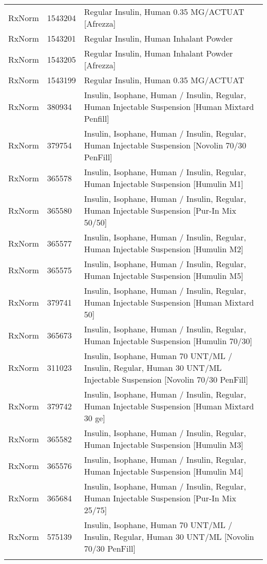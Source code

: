 \begin{longtable}{p{}p{}p{}}
  RxNorm & 1543204 & Regular Insulin, Human 0.35 MG/ACTUAT [Afrezza] \\ 
  RxNorm & 1543201 & Regular Insulin, Human Inhalant Powder \\ 
  RxNorm & 1543205 & Regular Insulin, Human Inhalant Powder [Afrezza] \\ 
  RxNorm & 1543199 & Regular Insulin, Human 0.35 MG/ACTUAT \\ 
  RxNorm & 380934 & Insulin, Isophane, Human / Insulin, Regular, Human Injectable Suspension [Human Mixtard Penfill] \\ 
  RxNorm & 379754 & Insulin, Isophane, Human / Insulin, Regular, Human Injectable Suspension [Novolin 70/30 PenFill] \\ 
  RxNorm & 365578 & Insulin, Isophane, Human / Insulin, Regular, Human Injectable Suspension [Humulin M1] \\ 
  RxNorm & 365580 & Insulin, Isophane, Human / Insulin, Regular, Human Injectable Suspension [Pur-In Mix 50/50] \\ 
  RxNorm & 365577 & Insulin, Isophane, Human / Insulin, Regular, Human Injectable Suspension [Humulin M2] \\ 
  RxNorm & 365575 & Insulin, Isophane, Human / Insulin, Regular, Human Injectable Suspension [Humulin M5] \\ 
  RxNorm & 379741 & Insulin, Isophane, Human / Insulin, Regular, Human Injectable Suspension [Human Mixtard 50] \\ 
  RxNorm & 365673 & Insulin, Isophane, Human / Insulin, Regular, Human Injectable Suspension [Humulin 70/30] \\ 
  RxNorm & 311023 & Insulin, Isophane, Human 70 UNT/ML / Insulin, Regular, Human 30 UNT/ML Injectable Suspension [Novolin 70/30 PenFill] \\ 
  RxNorm & 379742 & Insulin, Isophane, Human / Insulin, Regular, Human Injectable Suspension [Human Mixtard 30 ge] \\ 
  RxNorm & 365582 & Insulin, Isophane, Human / Insulin, Regular, Human Injectable Suspension [Humulin M3] \\ 
  RxNorm & 365576 & Insulin, Isophane, Human / Insulin, Regular, Human Injectable Suspension [Humulin M4] \\ 
  RxNorm & 365684 & Insulin, Isophane, Human / Insulin, Regular, Human Injectable Suspension [Pur-In Mix 25/75] \\ 
  RxNorm & 575139 & Insulin, Isophane, Human 70 UNT/ML / Insulin, Regular, Human 30 UNT/ML [Novolin 70/30 PenFill] \\ 
  \hline
\label{tab:codes_insulin-medications}
\end{longtable}
